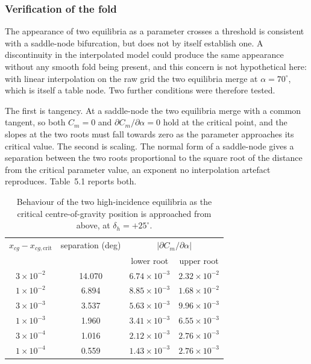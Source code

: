 \documentclass[
bindingoffset=5mm,  %
footnoteindent=3mm, %
hyphenation=true    %
]{src/wut-thesis}
\begin{document}
\subsubsection*{Verification of the fold}

The appearance of two equilibria as a parameter crosses a threshold is
consistent with a saddle-node bifurcation, but does not by itself establish
one. A discontinuity in the interpolated model could produce the same
appearance without any smooth fold being present, and this concern is not
hypothetical here: with linear interpolation on the raw grid the two
equilibria merge at $\alpha = 70^{\circ}$, which is itself a table node. Two
further conditions were therefore tested.

The first is tangency. At a saddle-node the two equilibria merge with a common
tangent, so both $C_{m} = 0$ and $\partial C_{m}/\partial\alpha = 0$ hold at
the critical point, and the slopes at the two roots must fall towards zero as
the parameter approaches its critical value. The second is scaling. The normal
form of a saddle-node gives a separation between the two roots proportional to
the square root of the distance from the critical parameter value, an exponent
no interpolation artefact reproduces. Table~5.1 reports both.
 
 \begin{table}[htbp]
 	\centering
 	\caption{Behaviour of the two high-incidence equilibria as the critical
 		centre-of-gravity position is approached from above, at
 		$\delta_{h} = +25^{\circ}$.}
 	\label{tab:fold}
 	\begin{tabular}{cccc}
 		\hline
 		$x_{cg} - x_{cg,\mathrm{crit}}$ & separation (deg)
 		& \multicolumn{2}{c}{$\left|\partial C_{m}/\partial\alpha\right|$} \\
 		& & lower root & upper root \\
 		\hline
 		$3\times10^{-2}$ & 14.070 & $6.74\times10^{-3}$ & $2.32\times10^{-2}$ \\
 		$1\times10^{-2}$ &  6.894 & $8.85\times10^{-3}$ & $1.68\times10^{-2}$ \\
 		$3\times10^{-3}$ &  3.537 & $5.63\times10^{-3}$ & $9.96\times10^{-3}$ \\
 		$1\times10^{-3}$ &  1.960 & $3.41\times10^{-3}$ & $6.55\times10^{-3}$ \\
 		$3\times10^{-4}$ &  1.016 & $2.12\times10^{-3}$ & $2.76\times10^{-3}$ \\
 		$1\times10^{-4}$ &  0.559 & $1.43\times10^{-3}$ & $2.76\times10^{-3}$ \\
 		\hline
 	\end{tabular}
 \end{table}
 
\end{document}
